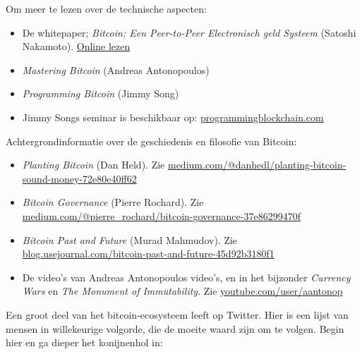 \documentclass[
  letterpaper,
]{scrbook}
\begin{document}
Om meer te lezen over de technische aspecten:

\begin{itemize}
\item
  De whitepaper; \emph{Bitcoin: Een Peer-to-Peer Electronisch geld
  Systeem} (Satoshi Nakamoto).
  \href{https://bitcoin.org/files/bitcoin-paper/bitcoin_nl.pdf}{Online
  lezen}
\item
  \emph{Mastering Bitcoin} (Andreas Antonopoulos)
\item
  \emph{Programming Bitcoin} (Jimmy Song)
\item
  Jimmy Songs seminar is beschikbaar op:
  \href{https://programmingblockchain.com}{programmingblockchain.com}
\end{itemize}

Achtergrondinformatie over de geschiedenis en filosofie van Bitcoin:

\begin{itemize}
\item
  \emph{Planting Bitcoin} (Dan Held). Zie
  \href{https://medium.com/@danhedl/planting-bitcoin-sound-money-72e80e40ff62}{medium.com/@danhedl/planting-bitcoin-sound-money-72e80e40ff62}
\item
  \emph{Bitcoin Governance} (Pierre Rochard). Zie
  \href{https://medium.com/@pierre_rochard/bitcoin-governance-37e86299470f}{medium.com/@pierre\_rochard/bitcoin-governance-37e86299470f}
\item
  \emph{Bitcoin Past and Future} (Murad Mahmudov). Zie
  \href{https://blog.usejournal.com/bitcoin-past-and-future-45d92b3180f1}{blog.usejournal.com/bitcoin-past-and-future-45d92b3180f1}
\item
  De video's van Andreas Antonopoulos video's, en in het bijzonder
  \emph{Currency Wars} en \emph{The Monument of Immutability}. Zie
  \href{https://www.youtube.com/user/aantonop}{youtube.com/user/aantonop}
\end{itemize}

Een groot deel van het bitcoin-ecosysteem leeft op Twitter. Hier is een
lijst van mensen in willekeurige volgorde, die de moeite waard zijn om
te volgen. Begin hier en ga dieper het konijnenhol in:
\end{document}
